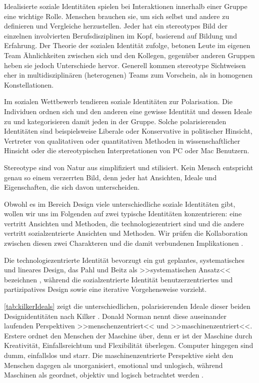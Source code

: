 \medskip Idealisierte soziale Identitäten spielen bei Interaktionen innerhalb einer Gruppe eine wichtige Rolle. Menschen brauchen sie, um sich selbst und andere zu definieren und Vergleiche herzustellen. Jeder hat ein stereotypes Bild der einzelnen involvierten Berufsdisziplinen im Kopf, basierend auf Bildung und Erfahrung. Der Theorie der sozialen Identität zufolge, betonen Leute im eigenen Team Ähnlichkeiten zwischen sich und den Kollegen, gegenüber anderen Gruppen heben sie jedoch Unterschiede hervor. Generell kommen stereotype Sichtweisen eher in multidisziplinären (heterogenen) Teams zum Vorschein, als in homogenen Konstellationen.

\medskip Im sozialen Wettbewerb tendieren soziale Identitäten zur Polarisation. Die Individuen ordnen sich und den anderen eine gewisse Identität und dessen Ideale zu und kategorisieren damit jeden in der Gruppe. Solche polarisierenden Identitäten sind beispielsweise Liberale oder Konservative in politischer Hinsicht, Vertreter von qualitativen oder quantitativen Methoden in wissenschaftlicher Hinsicht oder die stereotypischen Interpretationen von PC oder Mac Benutzern.

Stereotype sind von Natur aus simplifiziert und stilisiert. Kein Mensch entspricht genau so einem verzerrten Bild, denn jeder hat Ansichten, Ideale und Eigenschaften, die sich davon unterscheiden. 

\medskip Obwohl es im Bereich Design viele unterschiedliche soziale Identitäten gibt, wollen wir uns im Folgenden auf zwei typische Identitäten konzentrieren: eine vertritt Ansichten und Methoden, die technologiezentriert sind und die andere vertritt sozialzentrierte Ansichten und Methoden. Wir prüfen die Kollaboration zwischen diesen zwei Charakteren und die damit verbundenen Implikationen \citep{Kilker:1999}.

Die technologiezentrierte Identität bevorzugt ein gut geplantes, systematisches und lineares Design, das Pahl und Beitz als >>systematischen Ansatz<< bezeichnen \citep{Pahl:1988}, während die sozialzentrierte Identität benutzerzentriertes und partizipatives Design sowie eine iterative Vorgehensweise vorzieht.

\autoref{tab:kilkerIdeals} zeigt die unterschiedlichen, polarisierenden Ideale dieser beiden Designidentitäten nach Kilker \citep{Kilker:1999}. Donald Norman nennt diese auseinander laufenden Perspektiven >>menschenzentriert<< und >>maschinenzentriert<<. Erstere ordnet den Menschen der Maschine über, denn er ist der Maschine durch Kreativität, Einfallsreichtum und Flexibilität überlegen. Computer hingegen sind dumm, einfallslos und starr. Die maschinenzentrierte Perspektive sieht den Menschen dagegen als unorganisiert, emotional und unlogisch, während Maschinen als geordnet, objektiv und logisch betrachtet werden \citep{Norman:1994}. 

